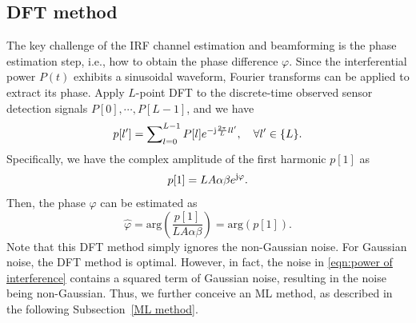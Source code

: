 \documentclass[conference,10pt,twocolumn]{IEEEtran}
\theoremstyle{nonumberplain}
\def \arg {\text{arg}}
\begin{document}
\subsection{DFT method}  \label{DFT method}
    The key challenge of the IRF channel estimation and beamforming is the phase estimation step, i.e., how to obtain the phase difference $\varphi$. Since the interferential power $P(t)$ exhibits a sinusoidal waveform, Fourier transforms can be applied to extract its phase. Apply $L$-point \ac{DFT} to the discrete-time  observed sensor detection signals $P[0],\cdots ,P[L-1]$, and we have
    \begin{equation}
        \label{DFT}
        p[l']=\sum\nolimits_{l=0}^{L-1}P[l]e^{-{\rm j}\frac{2\pi}{L}ll'},\quad \forall l'\in \{L\}.
    \end{equation}
    Specifically, we have the complex amplitude of the first harmonic $p[1]$ as 
    \begin{equation}
        \label{DFT l=1}
        p[1]=LA\alpha\beta  e^{{\rm j}\varphi}.
    \end{equation}
    Then, the phase $\varphi$ can be estimated as
    \begin{equation}
        \label{LS estimate result}
        \hat{\varphi}=\arg\left(\frac{p[1]}{LA\alpha\beta}\right) = \arg\left(p[1]\right).
    \end{equation}
    Note that this DFT method simply ignores the non-Gaussian noise. For Gaussian noise, the DFT method is optimal. However, in fact, the noise in \eqref{eqn:power of interference} contains a squared term of Gaussian noise, resulting in the noise being non-Gaussian. Thus, we further conceive an ML method, as described in the following Subsection~\ref{ML method}. 
\end{document}

